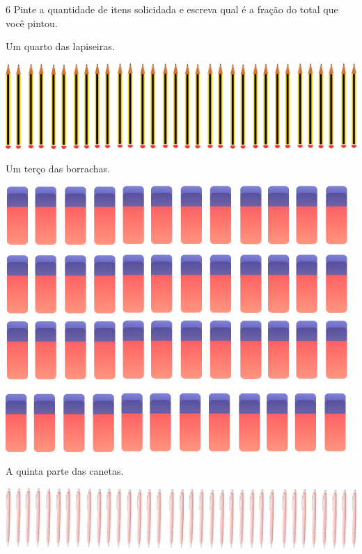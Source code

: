 \pagebreak
\num{6} Pinte a quantidade de itens solicidada e escreva qual é a fração do total que você pintou.

\begin{escolha}
\item Um quarto das lapiseiras.

\includegraphics[width=\textwidth]{media/image54.png}


\item  Um terço das borrachas.

\includegraphics[width=\textwidth]{media/image55.png}


\item A quinta parte das canetas.

\includegraphics[width=\textwidth]{media/image56.png}


\end{escolha}
